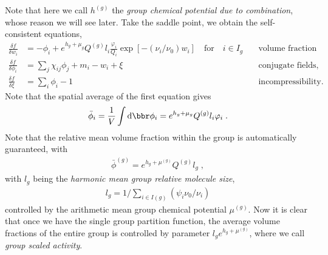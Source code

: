 \documentclass[aps,prl,reprint,onecolumn,groupedaddress,amsmath,amssymb]{revtex4-2}
\newcommand{\dd}{{\mathrm{d}}}
\newcommand{\bphi}{{\bar{\phi}}}
\begin{document}
Note that here we call $h^{(g)}$ the \emph{group chemical potential due to combination}, whose reason we will see later.
Take the saddle point, we obtain the self-consistent equations,
\begin{subequations}
    \begin{align}
        \frac{\delta f}{\delta w_i}    & = -\phi_i + e^{h_g + \mu_g} Q^{(g)} l_i \frac{ \varphi_i}{Q_i}\exp\left[-\left(\nu_i/\nu_0\right) w_i\right]  \quad \text{for} \quad i\in I_g \quad & \text{volume fraction fields,} \\
        \frac{\delta f}{\delta \phi_i} & = \sum_j \chi_{ij} \phi_j + m_i -w_i + \xi     \quad                                                                                                & \text{conjugate fields,}       \\
        \frac{\delta f}{\delta \xi}    & = \sum_i \phi_i -1     \quad                                                                                                                        & \text{incompressibility.}
    \end{align}
\end{subequations}
Note that the spatial average of the first equation gives
\begin{align}
    \bphi_i = \frac{1}{V} \int \dd \bbr \phi_i = e^{h_g + \mu_g} Q^{(g)} l_i \varphi_i \;.
\end{align}
Note that the relative mean volume fraction within the group is automatically guaranteed, with
\begin{align}
    \bphi^{(g)} =  e^{h_g + \mu^{(g)}} Q^{(g)} l_g \;,
\end{align}
with $l_g$ being the \emph{harmonic mean group relative molecule size},
\begin{align}
    l_g = 1/\sum_{i \in I(g)} \left(\psi_i \nu_0 / \nu_i\right)
\end{align}
controlled by the arithmetic mean group chemical potential $\mu^{(g)}$.
Now it is clear that once we have the single group partition function, the average volume fractions of the entire group is controlled by parameter $l_g e^{h_g + \mu^{(g)}}$, where we call \emph{group scaled activity}.
\end{document}
